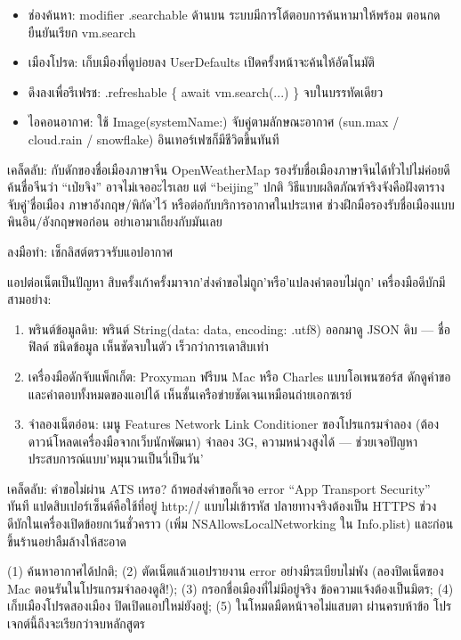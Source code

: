 
\begin{itemize}
  \item ช่องค้นหา: modifier .searchable ด้านบน ระบบมีการโต้ตอบการค้นหามาให้พร้อม ตอนกดยืนยันเรียก vm.search
  \item เมืองโปรด: เก็บเมืองที่ดูบ่อยลง UserDefaults เปิดครั้งหน้าจะค้นให้อัตโนมัติ
  \item ดึงลงเพื่อรีเฟรช: .refreshable \{ await vm.search(...) \} จบในบรรทัดเดียว
  \item ไอคอนอากาศ: ใช้ Image(systemName:) จับคู่ตามลักษณะอากาศ (sun.max / cloud.rain / snowflake) อินเทอร์เฟซก็มีชีวิตขึ้นทันที
\end{itemize}

\begin{tcbinfo}{เคล็ดลับ: กับดักของชื่อเมืองภาษาจีน}
OpenWeatherMap รองรับชื่อเมืองภาษาจีนได้ทั่วไปไม่ค่อยดี ค้นชื่อจีนว่า “เป่ยจิง” อาจไม่เจออะไรเลย แต่ “beijing” ปกติ วิธีแบบผลิตภัณฑ์จริงจังคือฝังตารางจับคู่'ชื่อเมือง ภาษาอังกฤษ/พิกัด'ไว้ หรือต่อกับบริการอากาศในประเทศ ช่วงฝึกมือรองรับชื่อเมืองแบบพินอิน/อังกฤษพอก่อน อย่าเอามาเถียงกับมันเลย

\end{tcbinfo}

\begin{tcbpractice}{ลงมือทำ: เช็กลิสต์ตรวจรับแอปอากาศ}

แอปต่อเน็ตเป็นปัญหา สิบครั้งเก้าครั้งมาจาก'ส่งคำขอไม่ถูก'หรือ'แปลงคำตอบไม่ถูก' เครื่องมือดีบักมีสามอย่าง:

\begin{enumerate}
  \item พรินต์ข้อมูลดิบ: พรินต์ String(data: data, encoding: .utf8) ออกมาดู JSON ดิบ — ชื่อฟิลด์ ชนิดข้อมูล เห็นชัดจบในตัว เร็วกว่าการเดาสิบเท่า
  \item เครื่องมือดักจับแพ็กเก็ต: Proxyman ฟรีบน Mac หรือ Charles แบบโอเพนซอร์ส ดักดูคำขอและคำตอบทั้งหมดของแอปได้ เห็นชั้นเครือข่ายชัดเจนเหมือนถ่ายเอกซเรย์
  \item จำลองเน็ตอ่อน: เมนู Features Network Link Conditioner ของโปรแกรมจำลอง (ต้องดาวน์โหลดเครื่องมือจากเว็บนักพัฒนา) จำลอง 3G, ความหน่วงสูงได้ — ช่วยเจอปัญหาประสบการณ์แบบ'หมุนวนเป็นวี่เป็นวัน'
\end{enumerate}

\begin{tcbinfo}{เคล็ดลับ: คำขอไม่ผ่าน ATS เหรอ?}
ถ้าพอส่งคำขอก็เจอ error “App Transport Security” ทันที แปดสิบเปอร์เซ็นต์คือใช้ที่อยู่ http:// แบบไม่เข้ารหัส ปลายทางจริงต้องเป็น HTTPS ช่วงดีบักในเครื่องเปิดข้อยกเว้นชั่วคราว (เพิ่ม NSAllowsLocalNetworking ใน Info.plist) และก่อนขึ้นร้านอย่าลืมล้างให้สะอาด

\end{tcbinfo}

(1) ค้นหาอากาศได้ปกติ; (2) ตัดเน็ตแล้วแอปรายงาน error อย่างมีระเบียบไม่พัง (ลองปิดเน็ตของ Mac ตอนรันในโปรแกรมจำลองดูสิ!); (3) กรอกชื่อเมืองที่ไม่มีอยู่จริง ข้อความแจ้งต้องเป็นมิตร; (4) เก็บเมืองโปรดสองเมือง ปิดเปิดแอปใหม่ยังอยู่; (5) ในโหมดมืดหน้าจอไม่แสบตา ผ่านครบห้าข้อ โปรเจกต์นี้ถึงจะเรียกว่าจบหลักสูตร

\end{tcbpractice}

